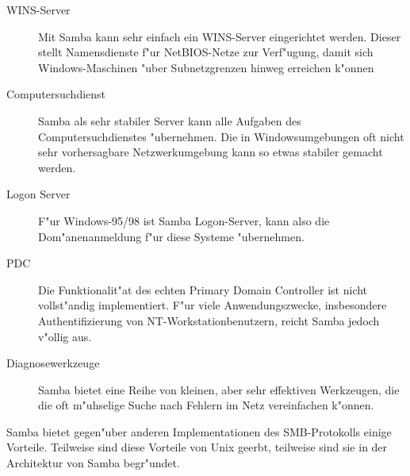 \documentclass{scrartcl}\usepackage{pslatex}\typearea{12}
\begin{document}
\begin{description}
  
\item[WINS-Server] Mit Samba kann sehr einfach ein WINS-Server
  eingerichtet werden. Dieser stellt Namensdienste f"ur NetBIOS-Netze
  zur Verf"ugung, damit sich Windows-Maschinen "uber Subnetzgrenzen
  hinweg erreichen k"onnen
  
\item[Computersuchdienst] Samba als sehr stabiler Server kann alle
  Aufgaben des Computersuchdienstes "ubernehmen. Die in Windowsumgebungen
  oft nicht sehr vorhersagbare Netzwerkumgebung kann so etwas 
  stabiler gemacht werden.
  
\item[Logon Server] F"ur Windows-95/98 ist Samba Logon-Server, kann
  also die Dom"anenanmeldung f"ur diese Systeme "ubernehmen.
  
\item[PDC] Die Funktionalit"at des echten Primary Domain Controller
  ist nicht vollst"andig implementiert. F"ur viele Anwendungszwecke,
  insbesondere Authentifizierung von NT-Workstation\-be\-nu\-tzern, reicht
  Samba jedoch v"ollig aus.
  
\item[Diagnosewerkzeuge] Samba bietet eine Reihe von kleinen, aber
sehr effektiven Werkzeugen, die die oft m"uhselige Suche nach Fehlern
im Netz vereinfachen k"onnen.

\end{description}

Samba bietet gegen"uber anderen Implementationen des
SMB-Protokolls einige Vorteile. Teilweise sind diese Vorteile von Unix
geerbt, teilweise sind sie in der Architektur von Samba begr"undet.
\end{document}

